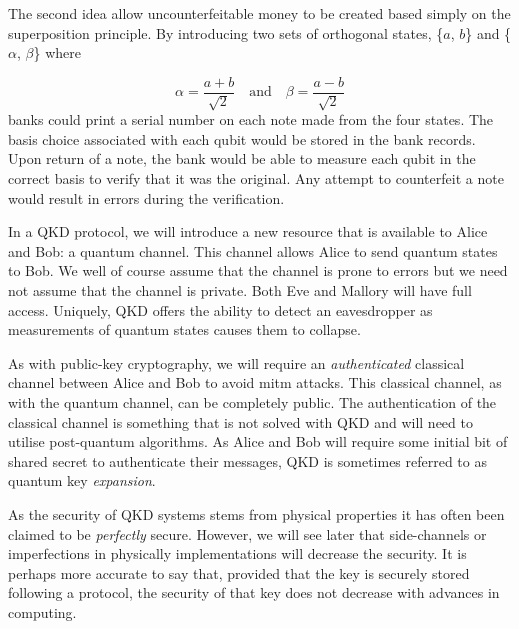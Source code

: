 The second idea allow uncounterfeitable money to be created based simply on the superposition principle. By introducing two sets of orthogonal states, \{$a$, $b$\} and \{$\alpha$, $\beta$\} where

\begin{equation}
	\alpha = \frac{a+b}{\sqrt{2}} \quad \text{and} \quad \beta = \frac{a-b}{\sqrt{2}}
\end{equation}
banks could print a serial number on each note made from the four states. The basis choice associated with each qubit would be stored in the bank records. Upon return of a note, the bank would be able to measure each qubit in the correct basis to verify that it was the original. Any attempt to counterfeit a note would result in errors during the verification. 


In a \ac{QKD} protocol, we will introduce a new resource that is available to Alice and Bob:  a quantum channel. This channel allows Alice to send quantum states to Bob. We well of course assume that the channel is prone to errors but we need not assume that the channel is private. Both Eve and Mallory will have full access. Uniquely, \ac{QKD} offers the ability to detect an eavesdropper as measurements of quantum states causes them to collapse.

As with public-key cryptography, we will require an \emph{authenticated} classical channel between Alice and Bob to avoid \ac{mitm} attacks. This classical channel, as with the quantum channel, can be completely public. The authentication of the classical channel is something that is not solved with \ac{QKD} and will need to utilise post-quantum algorithms. As Alice and Bob will require some initial bit of shared secret to authenticate their messages, \ac{QKD} is sometimes referred to as quantum key \emph{expansion}. 

As the security of \ac{QKD} systems stems from physical properties it has often been claimed to be \emph{perfectly} secure. However, we will see later that side-channels or imperfections in physically implementations will decrease the security. It is perhaps more accurate to say that, provided that the key is securely stored following a protocol, the security of that key does not decrease with advances in computing. 


